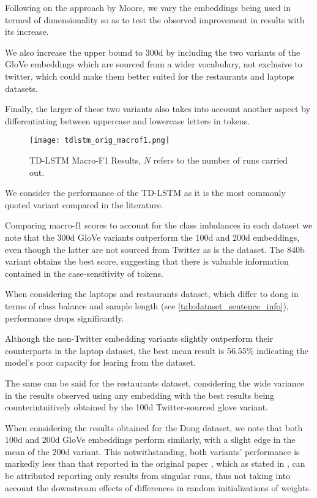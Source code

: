 \documentclass[../../fyp.tex]{subfiles}
\begin{document}
Following on the approach by Moore, we vary the embeddings being used in termed of dimensionality so as to test the observed improvement in results with its increase. 

We also increase the upper bound to 300d by including the two variants of the GloVe embeddings which are sourced from a wider vocabulary, not exclusive to twitter, which could make them better suited for the restaurants and laptops datasets. 

Finally, the larger of these two variants also takes into account another aspect by differentiating between uppercase and lowercase letters in tokens. 

\begin{figure}[!ht]
	\centering
	\texttt{[image: tdlstm\_orig\_macrof1.png]}
	\caption{TD-LSTM Macro-F1 Results, $N$ refers to the number of runs carried out.}
	\label{fig:ffnn}
\end{figure}

We consider the performance of the TD-LSTM as it is the most commonly quoted variant compared in the literature. 

Comparing macro-f1 scores to account for the class imbalances in each dataset we note that the 300d GloVe variants outperform the 100d and 200d embeddings, even though the latter are not sourced from Twitter as is the dataset. The 840b variant obtains the best score, suggesting that there is valuable information contained in the case-sensitivity of tokens.

When considering the laptops and restaurants dataset, which differ to dong in terms of class balance and sample length (see \ref{tab:dataset_sentence_info}), performance drops significantly. 

Although the non-Twitter embedding variants slightly outperform their counterparts in the laptop dataset, the best mean result is 56.55\% indicating the model's poor capacity for learing from the dataset. 

The same can be said for the restaurants dataset, considering the wide variance in the results observed using any embedding with the best results being counterintuitively obtained by the 100d Twitter-sourced glove variant.

When considering the results obtained for the Dong dataset, we note that both 100d and 200d GloVe embeddings perform similarly, with a slight edge in the mean of the 200d variant. This notwithstanding, both variants' performance is markedly less than that reported in the original paper \cite{tang2016b}, which as stated in \cite{moore2018}, can be attributed reporting only results from singular runs, thus not taking into account the downstream effects of differences in random initializations of weights. 
\end{document}
